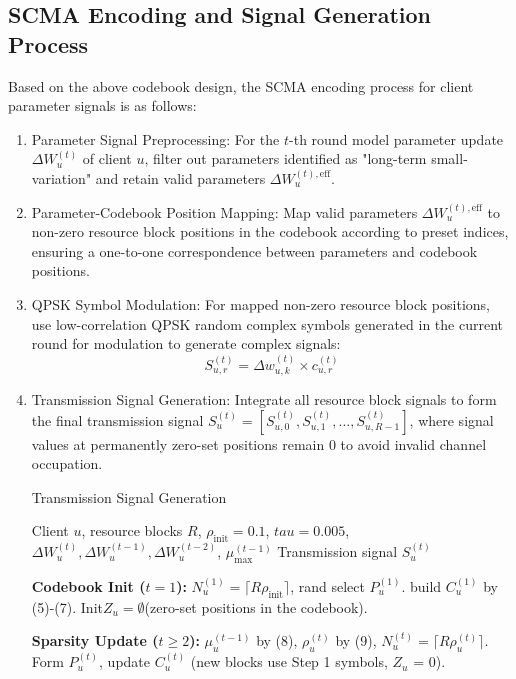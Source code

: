 \documentclass[runningheads]{llncs}
\begin{document}
\subsection{SCMA Encoding and Signal Generation Process}
Based on the above codebook design, the SCMA encoding process for client parameter signals is as follows:
\begin{enumerate}
\item Parameter Signal Preprocessing: For the $t$-th round model parameter update $\Delta W_u^{(t)}$ of client $u$, filter out parameters identified as "long-term small-variation" and retain valid parameters $\Delta W_u^{(t),\text{eff}}$.

\item Parameter-Codebook Position Mapping: Map valid parameters $\Delta W_u^{(t),\text{eff}}$ to non-zero resource block positions in the codebook according to preset indices, ensuring a one-to-one correspondence between parameters and codebook positions.

\item QPSK Symbol Modulation: For mapped non-zero resource block positions, use low-correlation QPSK random complex symbols generated in the current round for modulation to generate complex signals:
\begin{equation*}
    S_{u,r}^{(t)} = \Delta w_{u,k}^{(t)} \times c_{u,r}^{(t)}\tag{10}
\end{equation*}
\item Transmission Signal Generation: Integrate all resource block signals to form the final transmission signal $S_u^{(t)} = [S_{u,0}^{(t)}, S_{u,1}^{(t)}, \ldots, S_{u,R-1}^{(t)}]$, where signal values at permanently zero-set positions remain $0$ to avoid invalid channel occupation.
\begin{algorithm}[h]
\caption{Transmission Signal Generation}
\label{alg:signal_gen}
\begin{algorithmic}[1]
\Require
Client \( u \), resource blocks \( R \), \( \rho_{\text{init}}=0.1 \), \( tau=0.005 \), \( \Delta W_u^{(t)}, \Delta W_u^{(t-1)}, \Delta W_u^{(t-2)} \), \( \mu_{\text{max}}^{(t-1)} \)
\Ensure
Transmission signal \( S_u^{(t)} \)

\State \textbf{Codebook Init (\( t=1 \)):}
\State \( N_u^{(1)} = \lceil R \rho_{\text{init}} \rceil \), rand select \( P_u^{(1)} \).
\State build \( C_u^{(1)} \) by (5)-(7).
\State Init\( Z_u = \emptyset \)(zero-set positions in the codebook).

\State \textbf{Sparsity Update (\( t \geq 2 \)):}
\State \( \mu_u^{(t-1)} \) by (8), \( \rho_u^{(t)} \) by (9), \( N_u^{(t)} = \lceil R \rho_u^{(t)} \rceil \).
\State Form \( P_u^{(t)} \), update \( C_u^{(t)} \) (new blocks use Step 1 symbols, \( Z_u \) = 0).


\end{algorithmic}
\end{algorithm}
\end{enumerate}
\end{document}
